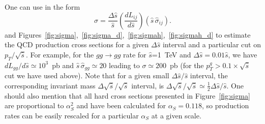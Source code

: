 \documentclass[12pt]{iopart}
\def\as{\alpha_S}
\begin{document}
%
One can use  in the form
\begin{equation}
\sigma=\frac{\Delta\hat{s}}{\hat{s}}
\left(\frac{d L_{ij}}{d \hat{s}}\right)
\left(\hat{s} \,\hat{\sigma}_{ij} \right).
\end{equation}
and Figures~\ref{fig:sigma},~\ref{fig:sigma_d},~\ref{fig:sigmah},~\ref{fig:sigmah_d}
to estimate  the QCD production cross sections 
for a given $\Delta \hat{s}$ interval and a particular cut on $p_T/\sqrt{\hat{s}}$.
For example, for the $gg \rightarrow gg$  rate
for $\hat{s}$=1~TeV  and $\Delta\hat{s}=0.01\hat{s}$,
we have  $d L_{gg}/d \hat{s}\simeq 10^3$~pb and 
$\hat{s} \,\hat{\sigma}_{gg}\simeq 20$
leading to $\sigma\simeq 200$~pb 
(for the $p_T^g> 0.1\times\sqrt{\hat{s}}$ cut we have used above).
Note that for a given small $\Delta\hat{s}/\hat{s}$ interval,
the corresponding  invariant mass 
$\Delta\sqrt{\hat{s}}/\sqrt{\hat{s}}$ interval, is 
$\Delta\sqrt{\hat{s}}/\sqrt{\hat{s}}\simeq \frac{1}{2}\Delta\hat{s}/\hat{s}$.
One should also mention  that all hard cross sections presented in Figure~\ref{fig:sigma}
are proportional  to $\as^2$ and have been calculated for
$\as=0.118$, so production rates can be easily rescaled 
for a particular $\as$ at a given scale.
\end{document}
